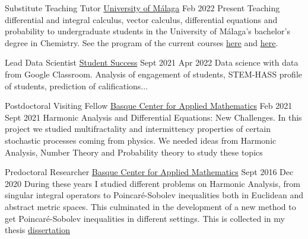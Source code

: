 \nopagebreak
\begin{employment}
    {Substitute Teaching Tutor}
    {\href{https://www.uma.es/}{University of Málaga}}
    {Feb 2022}
    {Present}
    {Teaching differential and integral calculus, vector calculus, differential equations and probability to undergraduate students in the University of Málaga's bachelor's degree in Chemistry. See the program of the current courses \href{https://oas.sci.uma.es:8443/ht/2022/ProgramasAsignaturas_Titulacion_5004_AsigUMA_51634.pdf}{here} and \href{https://oas.sci.uma.es:8443/ht/2022/ProgramasAsignaturas_Titulacion_5004_AsigUMA_51639.pdf}{here}.}
\end{employment}
\begin{employment}
    {Lead Data Scientist}
    {\href{https://studentsuccess.app/es/}{Student Success}}
    {Sept 2021}
    {Apr 2022}
    {Data science with data from Google Classroom. Analysis of  engagement of students, STEM-HASS profile of students, prediction of  califications...}
\end{employment}

\begin{employment}
    {Postdoctoral Visiting Fellow}
    { \href{http://www.bcamath.org/es/}{Basque Center for Applied Mathematics}}
    {Feb 2021}
    {Sept 2021}
    {Harmonic Analysis and Differential Equations: New Challenges. In this project we studied multifractality and intermittency properties of certain stochastic processes coming from physics. We needed ideas from Harmonic Analysis, Number Theory and Probability theory to study these topics}
\end{employment}

\begin{firstemployment}
    {Predoctoral Researcher}
    { \href{http://www.bcamath.org/es/}{Basque Center for Applied Mathematics}}
    {Sept 2016}
    {Dec 2020}
    {During these years I studied different problems on Harmonic Analysis, from singular integral operators to Poincaré-Sobolev inequalities both in Euclidean and abstract metric spaces. This culminated in the development of a new method to get Poincaré-Sobolev inequalities in different settings. This is collected in my thesis \href{https://bird.bcamath.org/handle/20.500.11824/1206}{dissertation}}
\end{firstemployment}